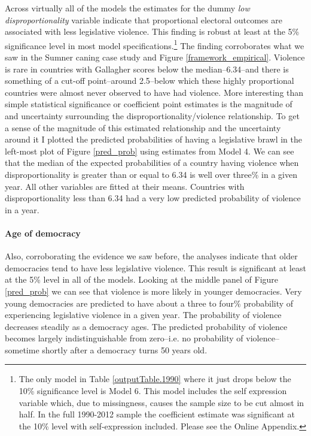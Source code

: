 \documentclass[a4paper]{article}\usepackage[]{graphicx}\usepackage[]{color}
\begin{document}
Across virtually all of the models the estimates for the dummy {\emph{low disproportionality}} variable indicate that proportional electoral outcomes are associated with less legislative violence. This finding is robust at least at the 5\% significance level in most model specifications.\footnote{The only model in Table \ref{outputTable.1990} where it just drops below the 10\% significance level is Model 6. This model includes the self expression variable which, due to missingness, causes the sample size to be cut almost in half. In the full 1990-2012 sample the coefficient estimate was significant at the 10\% level with self-expression included. Please see the Online Appendix.} The finding corroborates what we saw in the Sumner caning case study and Figure \ref{framework_empirical}. Violence is rare in countries with Gallagher scores below the median--6.34--and there is something of a cut-off point--around 2.5--below which these highly proportional countries were almost never observed to have had violence. More interesting than simple statistical significance or coefficient point estimates is the magnitude of and uncertainty surrounding the disproportionality/violence relationship. To get a sense of the magnitude of this estimated relationship and the uncertainty around it I plotted the predicted probabilities of having a legislative brawl in the left-most plot of Figure \ref{pred_prob} using estimates from Model 4. We can see that the median of the expected probabilities of a country having violence when disproportionality is greater than or equal to 6.34 is well over three\% in a given year. All other variables are fitted at their means. Countries with disproportionality less than 6.34 had a very low predicted probability of violence in a year.

\paragraph{Age of democracy}

Also, corroborating the evidence we saw before, the analyses indicate that older democracies tend to have less legislative violence. This result is significant at least at the 5\% level in all of the models. Looking at the middle panel of Figure \ref{pred_prob} we can see that violence is more likely in younger democracies. Very young democracies are predicted to have about a three to four\% probability of experiencing legislative violence in a given year. The probability of violence decreases steadily as a democracy ages. The predicted probability of violence becomes largely indistinguishable from zero--i.e. no probability of violence--sometime shortly after a democracy turns 50 years old.
\end{document}
